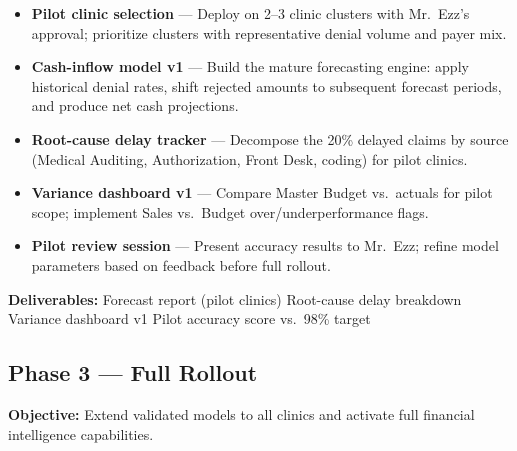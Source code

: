 \documentclass[11pt,a4paper]{article}
\begin{document}
\begin{tcolorbox}[infobox,title={Activities}]
\begin{itemize}
  \item \textbf{Pilot clinic selection} --- Deploy on 2--3 clinic clusters with Mr.\ Ezz's
        approval; prioritize clusters with representative denial volume and payer mix.
  \item \textbf{Cash-inflow model v1} --- Build the mature forecasting engine: apply historical
        denial rates, shift rejected amounts to subsequent forecast periods, and produce
        net cash projections.
  \item \textbf{Root-cause delay tracker} --- Decompose the 20\% delayed claims by source
        (Medical Auditing, Authorization, Front Desk, coding) for pilot clinics.
  \item \textbf{Variance dashboard v1} --- Compare Master Budget vs.\ actuals for
        pilot scope; implement Sales vs.\ Budget over/underperformance flags.
  \item \textbf{Pilot review session} --- Present accuracy results to Mr.\ Ezz; refine model
        parameters based on feedback before full rollout.
\end{itemize}
\end{tcolorbox}

\textbf{Deliverables:} Forecast report (pilot clinics) \textbullet{}
Root-cause delay breakdown \textbullet{} Variance dashboard v1 \textbullet{}
Pilot accuracy score vs.\ 98\% target

\subsection{Phase 3 --- Full Rollout}

\textbf{Objective:} Extend validated models to all clinics and activate full financial
intelligence capabilities.
\end{document}
